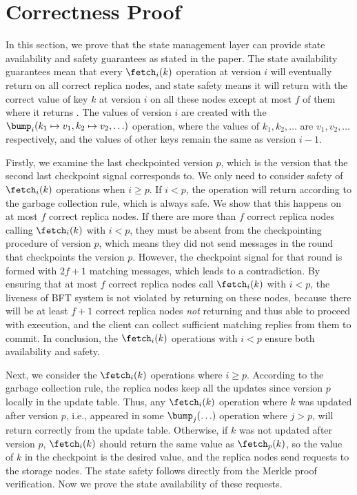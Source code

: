 \section{Correctness Proof}

In this section, we prove that the state management layer can provide state availability and safety guarantees as stated in the paper.
The state availability guarantees mean that every $\fetch_{i}(k)$ operation at version $i$ will eventually return on all correct replica nodes, and state safety means it will return with the correct value of key $k$ at version $i$ on all these nodes except at most $f$ of them where it returns \forward.
The values of version $i$ are created with the $\bump_{i}(k_1 \mapsto v_1, k_2 \mapsto v_2, \ldots)$ operation, where the values of $k_1, k_2, \ldots$ are $v_1, v_2, \ldots$ respectively, and the values of other keys remain the same as version $i-1$.

Firstly, we examine the last checkpointed version $p$, which is the version that the second last checkpoint signal corresponds to.
We only need to consider safety of $\fetch_{i}(k)$ operations when $i \geq p$.
If $i < p$, the operation will return \forward according to the garbage collection rule, which is always safe. 
We show that this happens on at most $f$ correct replica nodes.
If there are more than $f$ correct replica nodes calling $\fetch_{i}(k)$ with $i < p$, they must be absent from the checkpointing procedure of version $p$, which means they did not send \votec messages in the round that checkpoints the version $p$.
However, the checkpoint signal for that round is formed with $2f+1$ matching \votec messages, which leads to a contradiction.
By ensuring that at most $f$ correct replica nodes call $\fetch_{i}(k)$ with $i < p$, the liveness of BFT system is not violated by returning \forward on these nodes, because there will be at least $f+1$ correct replica nodes \emph{not} returning \forward and thus able to proceed with execution, and the client can collect sufficient matching replies from them to commit.
In conclusion, the $\fetch_{i}(k)$ operations with $i < p$ ensure both availability and safety.

Next, we consider the $\fetch_{i}(k)$ operations where $i \geq p$.
According to the garbage collection rule, the replica nodes keep all the updates since version $p$ locally in the update table.
Thus, any $\fetch_{i}(k)$ operation where $k$ was updated after version $p$, i.e., appeared in some $\bump_{j}(\ldots)$ operation where $j > p$, will return correctly from the update table.
Otherwise, if $k$ was not updated after version $p$, $\fetch_{i}(k)$ should return the same value as $\fetch_{p}(k)$, so the value of $k$ in the checkpoint is the desired value, and the replica nodes send \retrieve requests to the storage nodes.
The state safety follows directly from the Merkle proof verification.
Now we prove the state availability of these \retrieve requests.

